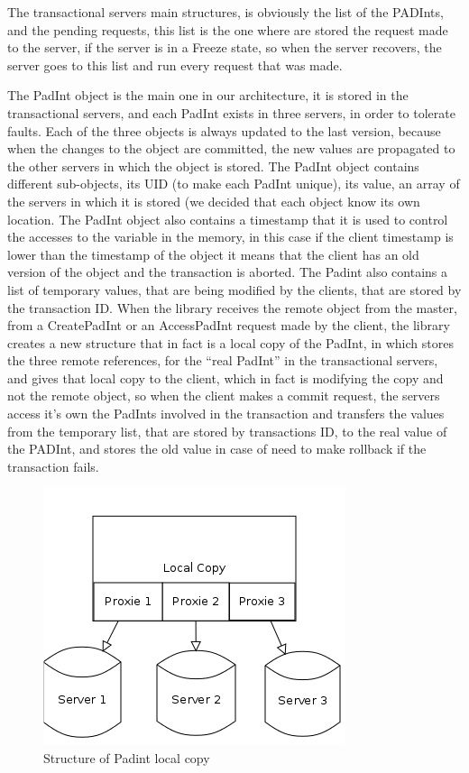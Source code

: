 \documentclass[times, 10pt,twocolumn]{article}
\begin{document}
The transactional servers main structures, is obviously the list of the PADInts, and the pending requests, this list is the one where are stored the request made to the server, if the server is in a Freeze state, so when the server recovers, the server goes to this list and run every request that was made.



The PadInt object is the main one in our architecture, it is stored in the transactional servers, and each PadInt exists in three servers, in order to tolerate faults. Each of the three objects is always updated to the last version, because when the changes to the object are committed, the new values are propagated to the other servers in which the object is stored. The PadInt object contains different sub-objects, its UID (to make each PadInt unique), its value, an array of the servers in which it is stored (we decided that each object know its own location. The PadInt object also contains a timestamp that it is used to control the accesses to the variable in the memory, in this case if the client timestamp is lower than the timestamp of the object it means that the client has an old version of the object and the transaction is aborted. The Padint also contains a list of temporary values, that are being modified by the clients, that are stored by the transaction ID. When the library receives the remote object from the master, from a CreatePadInt or an AccessPadInt request made by the client, the library creates a new structure that in fact is a local copy of the PadInt, in which stores the three remote references, for the ``real PadInt'' in the transactional servers, and gives that local copy to the client, which in fact is modifying the copy and not the remote object, so when the client makes a commit request, the servers access it's own the PadInts involved in the transaction and transfers the values from the temporary list, that are stored by transactions ID, to the real value of the PADInt, and stores the old value in case of need to make rollback if the transaction fails.



\begin{figure}[h!]

\centering

\includegraphics[scale=0.4]{Padint.png}

\caption{Structure of Padint local copy}

\end{figure}
\end{document}
